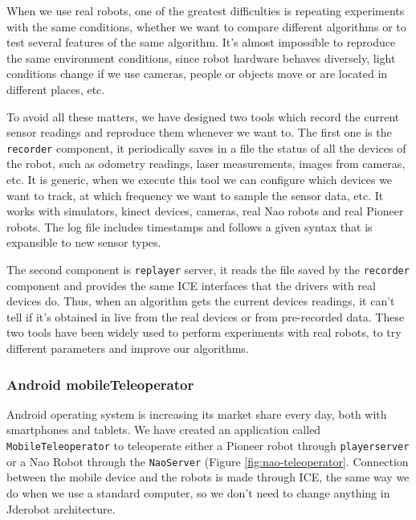 \documentclass[twocolumn]{svjour3}          %
\begin{document}
When we use real robots, one of the greatest difficulties is repeating experiments with the same conditions, whether we want to compare different algorithms or to test several features of the same algorithm. It's almost impossible to reproduce the same environment conditions, since robot hardware behaves diversely, light conditions change if we use cameras, people or objects move or are located in different places, etc.

To avoid all these matters, we have designed two tools which record the current sensor readings and reproduce them whenever we want to. The first one is the \texttt{recorder} component, it periodically saves in a file the status of all the devices of the robot, such as odometry readings, laser measurements, images from cameras, etc. It is generic, when we execute this tool we can configure which devices we want to track, at which frequency we want to sample the sensor data, etc. It works with simulators, kinect devices, cameras, real Nao robots and real Pioneer robots. The log file includes timestamps and follows a given syntax that is expansible to new sensor types.

The second component is \texttt{replayer} server, it reads the file saved by the \texttt{recorder} component and provides the same ICE interfaces that the drivers with real devices do. Thus, when an algorithm gets the current devices readings, it can't tell if it's obtained in live from the real devices or from pre-recorded data. These two tools have been widely used to perform experiments with real robots, to try different parameters and improve our algorithms.

\subsubsection{Android mobileTeleoperator}

Android operating system is increasing its market share every day, both with smartphones and tablets. 
We have created an application called \texttt{MobileTeleoperator} to teleoperate either a Pioneer robot through \texttt{playerserver} or a Nao Robot through the \texttt{NaoServer} (Figure \ref{fig:nao-teleoperator}. Connection between the mobile device and the robots is made through ICE, the same way we do when we use a standard computer, so we don't need to change anything in Jderobot architecture.
\end{document}
